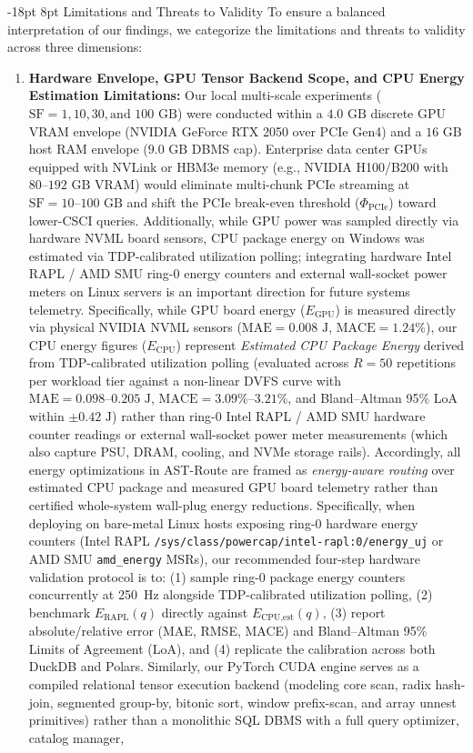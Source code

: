 \documentclass[10pt,a4paper]{article}
\makeatletter
\renewcommand\section{\@startsection{section}{1}{\z@}%
  {-18pt \@plus -4pt \@minus -2pt}%
  {8pt \@plus 2pt}%
  {\normalfont\large\bfseries}}
\makeatother
\begin{document}
\section{Limitations and Threats to Validity}
To ensure a balanced interpretation of our findings, we categorize the limitations and threats to validity across three dimensions:
\begin{enumerate}[leftmargin=1.5em,itemsep=2pt]
    \item \textbf{Hardware Envelope, GPU Tensor Backend Scope, and CPU Energy Estimation Limitations:} Our local multi-scale experiments ($\text{SF}=1, 10, 30, \text{and } 100\text{ GB}$) were conducted within a $4.0\text{ GB}$ discrete GPU VRAM envelope (NVIDIA GeForce RTX 2050 over PCIe Gen4) and a $16\text{ GB}$ host RAM envelope ($9.0\text{ GB}$ DBMS cap). Enterprise data center GPUs equipped with NVLink or HBM3e memory (e.g., NVIDIA H100/B200 with $80\text{--}192\text{ GB}$ VRAM) would eliminate multi-chunk PCIe streaming at $\text{SF}=10\text{--}100\text{ GB}$ and shift the PCIe break-even threshold ($\Phi_{\text{PCIe}}$) toward lower-CSCI queries. Additionally, while GPU power was sampled directly via hardware NVML board sensors, CPU package energy on Windows was estimated via TDP-calibrated utilization polling; integrating hardware Intel RAPL / AMD SMU ring-0 energy counters and external wall-socket power meters on Linux servers is an important direction for future systems telemetry. Specifically, while GPU board energy ($E_{\text{GPU}}$) is measured directly via physical NVIDIA NVML sensors ($\text{MAE}=0.008\text{ J}$, $\text{MACE}=1.24\%$), our CPU energy figures ($E_{\text{CPU}}$) represent \emph{Estimated CPU Package Energy} derived from TDP-calibrated utilization polling (evaluated across $R=50$ repetitions per workload tier against a non-linear DVFS curve with $\text{MAE}=0.098\text{--}0.205\text{ J}$, $\text{MACE}=3.09\%\text{--}3.21\%$, and Bland--Altman 95\% LoA within $\pm 0.42\text{ J}$) rather than ring-0 Intel RAPL / AMD SMU hardware counter readings or external wall-socket power meter measurements (which also capture PSU, DRAM, cooling, and NVMe storage rails). Accordingly, all energy optimizations in AST-Route are framed as \emph{energy-aware routing} over estimated CPU package and measured GPU board telemetry rather than certified whole-system wall-plug energy reductions. Specifically, when deploying on bare-metal Linux hosts exposing ring-0 hardware energy counters (Intel RAPL \texttt{/sys/class/powercap/intel-rapl:0/energy\_uj} or AMD SMU \texttt{amd\_energy} MSRs), our recommended four-step hardware validation protocol is to: (1) sample ring-0 package energy counters concurrently at 250~Hz alongside TDP-calibrated utilization polling, (2) benchmark $E_{\text{RAPL}}(q)$ directly against $E_{\text{CPU,est}}(q)$, (3) report absolute/relative error (MAE, RMSE, MACE) and Bland--Altman 95\% Limits of Agreement (LoA), and (4) replicate the calibration across both DuckDB and Polars. Similarly, our PyTorch CUDA engine serves as a compiled relational tensor execution backend (modeling core scan, radix hash-join, segmented group-by, bitonic sort, window prefix-scan, and array unnest primitives) rather than a monolithic SQL DBMS with a full query optimizer, catalog manager, 
\end{enumerate}
\end{document}
